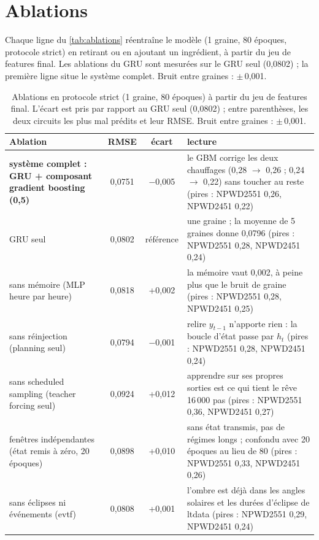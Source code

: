\documentclass[11pt,a4paper]{article}
\begin{document}
\section{Ablations}\label{sec:ablations}

Chaque ligne du \autoref{tab:ablations} réentraîne le modèle (1 graine, 80 époques, protocole strict) en retirant ou en ajoutant un ingrédient, à partir du jeu de features final. Les ablations du GRU sont mesurées sur le GRU seul (0,0802) ; la première ligne situe le système complet. Bruit entre graines : $\pm$\,0,001.

\begin{table}[htbp]
\centering\footnotesize
\caption{Ablations en protocole strict (1 graine, 80 époques) à partir du jeu de features final. L'écart est pris par rapport au GRU seul (0,0802) ; entre parenthèses, les deux circuits les plus mal prédits et leur RMSE. Bruit entre graines : $\pm$\,0,001.}
\label{tab:ablations}
\begin{tabularx}{\textwidth}{L{4.4cm} c c Y}
\toprule
Ablation & RMSE & écart & lecture \\
\midrule
\textbf{système complet : GRU + composant gradient boosting (0,5)} & 0,0751 & $-$0,005 & le GBM corrige les deux chauffages (0,28 $\rightarrow$ 0,26 ; 0,24 $\rightarrow$ 0,22) sans toucher au reste (pires : NPWD2551 0,26, NPWD2451 0,22) \\
GRU seul & 0,0802 & référence & une graine ; la moyenne de 5 graines donne 0,0796 (pires : NPWD2551 0,28, NPWD2451 0,24) \\
sans mémoire (MLP heure par heure) & 0,0818 & +0,002 & la mémoire vaut 0,002, à peine plus que le bruit de graine (pires : NPWD2551 0,28, NPWD2451 0,25) \\
sans réinjection (planning seul) & 0,0794 & $-$0,001 & relire $y_{t-1}$ n'apporte rien : la boucle d'état passe par $h_t$ (pires : NPWD2551 0,28, NPWD2451 0,24) \\
sans scheduled sampling (teacher forcing seul) & 0,0924 & +0,012 & apprendre sur ses propres sorties est ce qui tient le rêve 16\,000 pas (pires : NPWD2551 0,36, NPWD2451 0,27) \\
fenêtres indépendantes (état remis à zéro, 20 époques) & 0,0898 & +0,010 & sans état transmis, pas de régimes longs ; confondu avec 20 époques au lieu de 80 (pires : NPWD2551 0,33, NPWD2451 0,26) \\
sans éclipses ni événements (evtf) & 0,0808 & +0,001 & l'ombre est déjà dans les angles solaires et les durées d'éclipse de ltdata (pires : NPWD2551 0,29, NPWD2451 0,24) \\

\end{tabularx}
\end{table}
\end{document}
